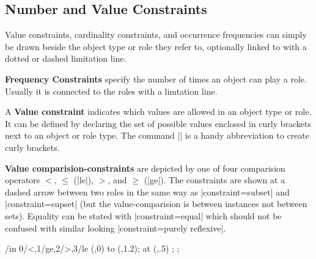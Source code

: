 \documentclass[a4paper,10pt]{article}
\begin{document}
\subsection{Number and Value Constraints}
Value constraints, cardinality constraints, and occurrence frequencies can simply be drawn beside the object type or role they refer to, optionally linked to with a dotted or dashed limitation line.

\noindent\textbf{Frequency Constraints} specify the number of times an object can play a role. Usually it is connected to the roles with a limtation line. %

\begin{codeexample}[width=3cm]
\end{codeexample}

\noindent A \textbf{Value constraint} indicates which values are allowed in an object type or role. It can be defined by declaring the set of possible values enclosed in curly brackets next to an object or role type. The command |\ormbraces| is a handy abbreviation to create curly brackets.

\begin{codeexample}[]
\end{codeexample}

\noindent\textbf{Value comparision-constraints} are depicted by one of four comparision operators $<$, $\le$ (|le|), $>$, and $\ge$ (|ge|). The constraints are shown at a dashed arrow between two roles in the same way as |constraint=subset| and |constraint=supset| (but the value-comparision is between instances not between sets). Equality can be stated with |constraint=equal| which should not be confused with similar looking |constraint=purely reflexive|.

\begin{codeexample}[]
\tikz \foreach \x/\s in {0/<,1/ge,2/>,3/le}{
  \draw[limits to] (\x,0) to (\x,1.2);
  \node[constraint=\s] at (\x,.5) {};
};
\end{codeexample}
\end{document}
